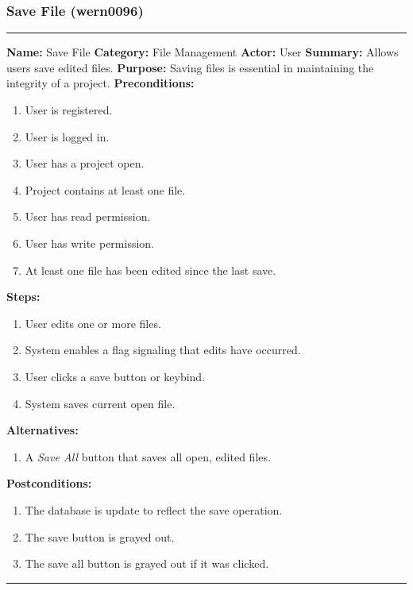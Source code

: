\documentclass[11pt]{report}
\begin{document}
\subsubsection{Save File (wern0096)}
\vspace{2pt}
\hrule
\vspace{8pt}
	\noindent\textbf{Name:} Save File \newline
	\textbf{Category:} File Management \newline
	\textbf{Actor:} User \newline
	\textbf{Summary:} Allows users save edited files. \newline
	\textbf{Purpose:} Saving files is essential in maintaining the integrity of a project. \newline
	\textbf{Preconditions:}
	\begin{enumerate}
		\item User is registered.
		\item User is logged in.
		\item User has a project open.
		\item Project contains at least one file.
		\item User has read permission.
		\item User has write permission.
		\item At least one file has been edited since the last save.
	\end{enumerate}
	\textbf{Steps:}
	\begin{enumerate}
		\item User edits one or more files.
		\item System enables a flag signaling that edits have occurred.
		\item User clicks a save button or keybind.
		\item System saves current open file.
	\end{enumerate}
	\textbf{Alternatives:}
	\begin{enumerate}
		\item A \textit{Save All} button that saves all open, edited files.
	\end{enumerate}
	\textbf{Postconditions:}
	\begin{enumerate}
		\item The database is update to reflect the save operation.
		\item The save button is grayed out.
		\item The save all button is grayed out if it was clicked.
	\end{enumerate}
\vspace{8pt}
\hrule
\newpage
\end{document}
